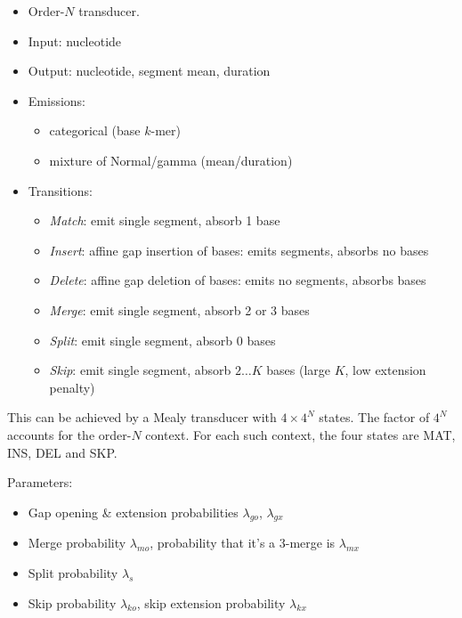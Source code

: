 \documentclass[10pt]{article}
\begin{document}
\begin{itemize}
\item Order-$N$ transducer.
\item Input: nucleotide
\item Output: nucleotide, segment mean, duration
\item Emissions:
 \begin{itemize}
 \item categorical (base $k$-mer)
 \item mixture of Normal/gamma (mean/duration)
 \end{itemize}
\item Transitions:
 \begin{itemize}
 \item {\em Match}: emit single segment, absorb 1 base
 \item {\em Insert}: affine gap insertion of bases: emits segments, absorbs no bases
 \item {\em Delete}: affine gap deletion of bases: emits no segments, absorbs bases
 \item {\em Merge}: emit single segment, absorb 2 or 3 bases
 \item {\em Split}: emit single segment, absorb 0 bases
 \item {\em Skip}: emit single segment, absorb $2 \ldots K$ bases (large $K$, low extension penalty)
 \end{itemize}
\end{itemize}

This can be achieved by a Mealy transducer with $4 \times 4^N$ states.
The factor of $4^N$ accounts for the order-$N$ context.
For each such context, the four states are MAT, INS, DEL and SKP.

\newcommand\pgapopen{\lambda_{go}}
\newcommand\pgapextend{\lambda_{gx}}
\newcommand\pmergeopen{\lambda_{mo}}
\newcommand\pmergeextend{\lambda_{mx}}
\newcommand\psplit{\lambda_s}
\newcommand\pskipopen{\lambda_{ko}}
\newcommand\pskipextend{\lambda_{kx}}

Parameters:
 \begin{itemize}
 \item Gap opening \& extension probabilities $\pgapopen$, $\pgapextend$
 \item Merge probability $\pmergeopen$, probability that it's a 3-merge is $\pmergeextend$
 \item Split probability $\psplit$
 \item Skip probability $\pskipopen$, skip extension probability $\pskipextend$
 \end{itemize}
\end{document}
